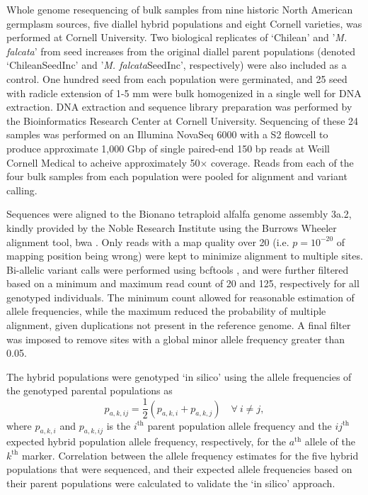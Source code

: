 \documentclass[12pt, letterpaper]{article}
\begin{document}
Whole genome resequencing of bulk samples from nine historic North American germplasm sources, five diallel hybrid populations and eight Cornell varieties, was performed at Cornell University. Two biological replicates of `Chilean' and '\emph{M. falcata}' from seed increases  from the original diallel parent populations (denoted `ChileanSeedInc' and '\emph{M. falcata}SeedInc', respectively) were also included as a control. One hundred seed from each population were germinated, and 25 seed with radicle extension of 1-5 mm were bulk homogenized in a single well for DNA extraction. DNA extraction and sequence library preparation was performed by the Bioinformatics Research Center at Cornell University. Sequencing of these 24 samples was performed on an Illumina NovaSeq 6000 with a S2 flowcell to produce approximate 1,000 Gbp of single paired-end 150 bp reads at Weill Cornell Medical to acheive approximately 50$\times$ coverage. Reads from each of the four bulk samples from each population were pooled for alignment and variant calling. 

Sequences were aligned to the Bionano tetraploid alfalfa genome assembly 3a.2, kindly provided by the Noble Research Institute using the Burrows Wheeler alignment tool, bwa \parencite{li2009}. Only reads with a map quality over 20 (i.e. $p = 10^{-20}$ of mapping position being wrong) were kept to minimize alignment to multiple sites. Bi-allelic variant calls were performed using bcftools \parencite[SAMtools]{li2011}, and were further filtered based on a minimum and maximum read count of 20 and 125, respectively for all genotyped individuals. The minimum count allowed for reasonable estimation of allele frequencies, while the maximum reduced the probability of multiple alignment, given duplications not present in the reference genome. A final filter was imposed to remove sites with a global minor allele frequency greater than 0.05.

The hybrid populations were genotyped `in silico' using the allele frequencies of the genotyped parental populations as
\[p_{a,k,ij} = \frac{1}{2} (p_{a,k,i} + p_{a,k,j}) \quad \forall \ i \neq j,\]
\noindent where $p_{a,k,i}$ and $p_{a,k,ij}$ is the $i^\text{th}$ parent population allele frequency and the $ij^\text{th}$ expected hybrid population allele frequency, respectively, for the $a^\text{th}$ allele of the $k^\text{th}$ marker. Correlation between the allele frequency estimates for the five hybrid populations that were sequenced, and their expected allele frequencies based on their parent populations were calculated to validate the `in silico' approach.
\end{document}
